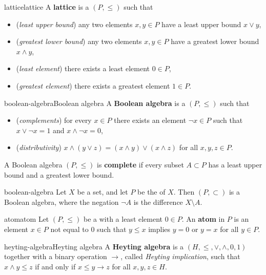 \begin{topic}{lattice}{lattice}
    A \textbf{lattice} is a  $(P, \le)$ such that
    \begin{itemize}
        \item (\textit{least upper bound}) any two elements $x, y \in P$ have a least upper bound $x \vee y$,
        \item (\textit{greatest lower bound}) any two elements $x, y \in P$ have a greatest lower bound $x \wedge y$,
        \item (\textit{least element}) there exists a least element $0 \in P$,
        \item (\textit{greatest element}) there exists a greatest element $1 \in P$.
    \end{itemize}
\end{topic}

\begin{topic}{boolean-algebra}{Boolean algebra}
    A \textbf{Boolean algebra} is a  $(P, \le)$ such that
    \begin{itemize}
        \item (\textit{complements}) for every $x \in P$ there exists an element $\neg x \in P$ such that $x \vee \neg x = 1$ and $x \wedge \neg x = 0$,
        \item (\textit{distributivity}) $x \wedge (y \vee z) = (x \wedge y) \vee (x \wedge z)$ for all $x, y, z \in P$.
    \end{itemize}
    A Boolean algebra $(P, \le)$ is \textbf{complete} if every subset $A \subset P$ has a least upper bound and a greatest lower bound.
\end{topic}

\begin{example}{boolean-algebra}
    Let $X$ be a set, and let $P$ be the  of $X$. Then $(P, \subset)$ is a Boolean algebra, where the negation $\neg A$ is the difference $X \setminus A$.
\end{example}

\begin{topic}{atom}{atom}
    Let $(P, \le)$ be a  with a least element $0 \in P$. An \textbf{atom} in $P$ is an element $x \in P$ not equal to $0$ such that $y \le x$ implies $y = 0$ or $y = x$ for all $y \in P$.
\end{topic}

\begin{topic}{heyting-algebra}{Heyting algebra}
    A \textbf{Heyting algebra} is a  $(H, \le, \vee, \wedge, 0, 1)$ together with a binary operation $\rightarrow$, called \textit{Heyting implication}, such that $x \wedge y \le z$ if and only if $x \le y \rightarrow z$ for all $x, y, z \in H$.
\end{topic}

